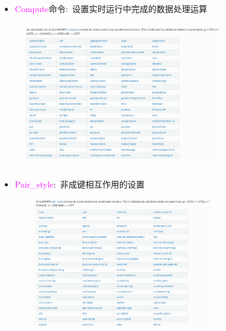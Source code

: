 \frame
{
	\frametitle{}
	\begin{itemize}
		\item \textcolor{magenta}{Compute}命令:~设置实时运行中完成的数据处理运算
	\end{itemize}
\begin{figure}[h!]
\centering
\vspace*{-0.1in}
\includegraphics[height=2.4in,width=3.4in,viewport=0 0 1150 760,clip]{Figures/LAMMPS-compute_command.png}
\label{LAMMPS-Compute}
\end{figure}
}

\frame
{
	\frametitle{}
	\begin{itemize}
		\item \textcolor{magenta}{Pair\_style}:~非成键相互作用的设置
	\end{itemize}
\begin{figure}[h!]
\centering
\vspace*{-0.1in}
\includegraphics[height=2.2in,width=3.4in,viewport=0 0 1100 760,clip]{Figures/LAMMPS-Pair_style-command.png}
\label{LAMMPS-Pair_style}
\end{figure}
}

